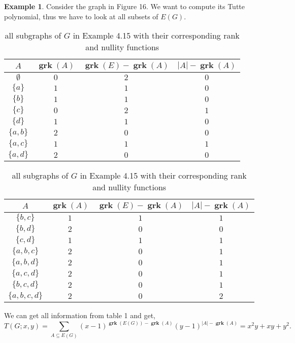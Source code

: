\documentclass[12pt,a4paper, twoside, autooneside=false]{scrartcl}
\theoremstyle{definition}
\newtheorem{beispiel}[theorem]{Example}
\theoremstyle{remark}
\numberwithin{equation}{section}
\DeclareMathOperator{\grk}{\mathbf{grk}} %
\begin{document}
\begin{beispiel}
Consider the graph in Figure 16. We want to compute its Tutte polynomial, thus we have to look at all subsets of $E(G)$.  
\begin{center}
        \label{fig:label}
\end{center}
\begin{table}[!h]
\begin{minipage}{.5\linewidth}
\scriptsize
\centering
\begin{tabular}{||c c c c||} 
 \hline
 $A$ & $\grk(A)$ & $\grk(E) - \grk(A)$ & $|A| - \grk(A)$ \\ [0.7ex] 
 \hline\hline
 $\emptyset$ & $0$ & $2$ & $0$\\
 $\{a\}$ & $1$ & $1$ & $0$\\ 
 $\{b\}$ & $1$ &$1$ & $0$\\
 $\{c\}$ &$0$ &$2$ &$1$ \\
 $\{d\}$ &$1$ &$1$ &$0$ \\
 $\{a,b\}$ &$2$ &$0$ &$0$ \\
 $\{a,c\}$ &$1$ &$1$ &$1$ \\
 $\{a,d\}$ &$2$ &$0$ &$0$ \\ [1ex] 
 \hline
\end{tabular}
\end{minipage}
\begin{minipage}{.5\linewidth}
\scriptsize
\centering
\begin{tabular}{||c c c c||} 
 \hline
 $A$ & $\grk(A)$ & $\grk(E) - \grk(A)$ & $|A| - \grk(A)$ \\ [0.7ex] 
 \hline\hline
 $\{b,c\}$ &$1$ &$1$ &$1$ \\
 $\{b,d\}$ &$2$ &$0$ &$0$ \\
 $\{c,d\}$ &$1$ &$1$ &$1$ \\
 $\{a,b,c\}$ &$2$ &$0$ &$1$ \\
$\{a,b,d\}$ &$2$ &$0$ &$1$ \\
$\{a,c,d\}$ &$2$ &$0$ &$1$ \\
$\{b,c,d\}$&$2$ &$0$ &$1$ \\
$\{a,b,c,d\}$ &$2$ &$0$ &$2$\\ [1ex] 
 \hline
\end{tabular}
\end{minipage}
\caption{all subgraphs of $G$ in Example 4.15 with their corresponding rank and nullity functions}
\label{table:1}
\end{table}
We can get all information from table 1 and get, 
\[
T(G;x,y) = \sum_{A \subseteq E(G)} (x - 1)^{\grk(E(G)) - \grk(A)}(y - 1)^{|A| - \grk(A)} = x^2y + xy + y^2.
\]
\end{beispiel} 
\end{document}

